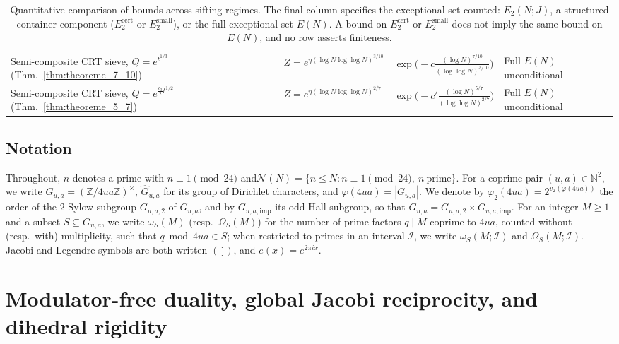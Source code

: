 \documentclass[11pt, a4paper]{article}
\theoremstyle{plain}
\theoremstyle{definition}
\newcommand{\N}{\mathbb{N}}
\newcommand{\Z}{\mathbb{Z}}
\newcommand{\leg}[2]{\left(\frac{#1}{#2}\right)}
\begin{document}
\begin{table}[H]
{\begin{tabular}{llll}
Semi-composite CRT sieve, $Q=e^{t^{1/3}}$ (Thm.~\ref{thm:theoreme_7_10}) & $Z=e^{\eta(\log N\log\log N)^{3/10}}$ & $\exp\!\big(-c\frac{(\log N)^{7/10}}{(\log\log N)^{3/10}}\big)$ & Full $E(N)$ unconditional \\
Semi-composite CRT sieve, $Q=e^{\frac{c_3}{2}t^{1/2}}$ (Thm.~\ref{thm:theoreme_5_7}) & $Z=e^{\eta(\log N\log\log N)^{2/7}}$ & $\exp\!\big(-c'\frac{(\log N)^{5/7}}{(\log\log N)^{2/7}}\big)$ & Full $E(N)$ unconditional \\
\bottomrule
\end{tabular}%
}
\caption{Quantitative comparison of bounds across sifting regimes. The final column specifies the exceptional set counted: $E_2(N;J)$, a structured container component ($E_2^{\mathrm{cert}}$ or $E_2^{\mathrm{small}}$), or the full exceptional set $E(N)$. A bound on $E_2^{\mathrm{cert}}$ or $E_2^{\mathrm{small}}$ does not imply the same bound on $E(N)$, and no row asserts finiteness.}
\label{tab:main_regimes}
\end{table}

\subsection{Notation}\label{subsec:notation}

Throughout, $n$ denotes a prime with $n\equiv1\pmod{24}$ and\linebreak $\mathcal{N}(N)=\{n\le N:\allowbreak n\equiv1\pmod{24},\ n\ \text{prime}\}$. For a coprime pair $(u,a)\in\N^{2}$, we write $G_{u,a}=(\Z/4ua\Z)^{\times}$, $\widehat{G}_{u,a}$ for its group of Dirichlet characters, and $\varphi(4ua)=|G_{u,a}|$. We denote by $\varphi_2(4ua)=2^{v_2(\varphi(4ua))}$ the order of the $2$-Sylow subgroup $G_{u,a,2}$ of $G_{u,a}$, and by $G_{u,a,\mathrm{imp}}$ its odd Hall subgroup, so that $G_{u,a}=G_{u,a,2}\times G_{u,a,\mathrm{imp}}$. For an integer $M\ge1$ and a subset $S\subseteq G_{u,a}$, we write $\omega_S(M)$ (resp.\ $\Omega_S(M)$) for the number of prime factors $q\mid M$ coprime to $4ua$, counted without (resp.\ with) multiplicity, such that $q\bmod 4ua\in S$; when restricted to primes in an interval $\mathcal{I}$, we write $\omega_S(M;\mathcal{I})$ and $\Omega_S(M;\mathcal{I})$. Jacobi and Legendre symbols are both written $\leg{\cdot}{\cdot}$, and $e(x)=e^{2\pi i x}$.

\section{Modulator-free duality, global Jacobi reciprocity, and dihedral rigidity}\label{sec:algebraic_rigidity}
\end{document}
